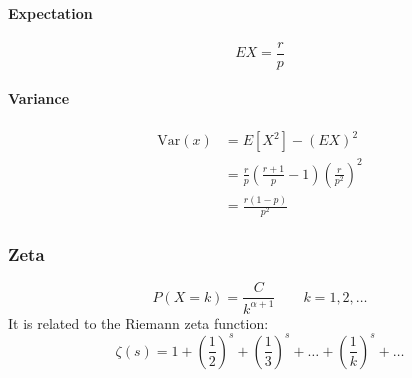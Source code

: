 \paragraph{Expectation}
$$EX = \frac{r}{p}$$

\paragraph{Variance}
    \begin{equation*}
    \begin{aligned}
        \text{Var}(x) &= E[X^2] - (EX)^2 \\
                      &= \frac{r}{p}(\frac{r+1}{p}-1) (\frac{r}{p^2})^2 \\
                      &= \frac{r(1-p)}{p^2}
    \end{aligned}
    \end{equation*}

\subsubsection{Zeta}
$$P(X=k)=\frac{C}{k^{\alpha+1}} \qquad k=1,2,\dots$$
It is related to the Riemann zeta function:
$$\zeta(s) = 1 + (\frac{1}{2})^s + (\frac{1}{3})^s + \dots + (\frac{1}{k})^s + \dots$$

